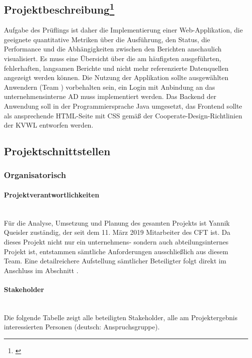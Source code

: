 \subsection[Projektbeschreibung]{Projektbeschreibung\footnote{\cite{Projektantrag}}} 
\label{sec:Projektbeschreibung}
\begin{displayquote}
	Aufgabe des Prüflings \autorName\xspace ist daher die Implementierung einer Web-Applikation, die geeignete quantitative Metriken über die Ausführung, den Status, die Performance und die Abhängigkeiten zwischen den Berichten anschaulich visualisiert. Es muss eine Übersicht über die am häufigsten ausgeführten, fehlerhaften, langsamen Berichte und nicht mehr referenzierte Datenquellen angezeigt werden können. Die Nutzung der Applikation sollte ausgewählten Anwendern (Team \teamName) vorbehalten sein, \dahe ein Login mit Anbindung an das unternehmensinterne \ac{AD} muss implementiert werden. Das Backend der Anwendung soll in der Programmiersprache Java umgesetzt, das Frontend sollte als ansprechende HTML-Seite mit CSS gemäß der Cooperate-Design-Richtlinien der \ac{KVWL} entworfen werden.
\end{displayquote}

\subsection{Projektschnittstellen} 
\label{sec:Projektschnittstellen}

\subsubsection{Organisatorisch} 
\label{sec:Projektschnittstellen:Organisatorisch}

\paragraph{Projektverantwortlichkeiten} ~\\
\label{p:Projektverantwortlichkeiten}
Für die Analyse, Umsetzung und Planung des gesamten Projekts ist Yannik Queisler zuständig, der seit dem 11. März 2019 Mitarbeiter des \ac{CFT} \teamName ist. Da dieses Projekt nicht nur ein unternehmens- sondern auch abteilungsinternes Projekt ist, entstammen sämtliche Anforderungen ausschließlich aus diesem Team. Eine detailreichere Aufstellung sämtlicher Beteiligter folgt direkt im Anschluss im Abschnitt .

\paragraph{Stakeholder} ~\\
\label{p:Stakeholder}
Die folgende Tabelle zeigt alle beteiligten Stakeholder, \dahe alle am Projektergebnis interessierten Personen (deutsch: Anspruchsgruppe).

